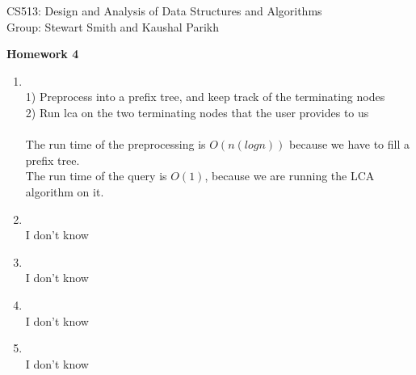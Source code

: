 \documentclass[11pt]{article}
\begin{document}

\noindent CS513: Design and Analysis of Data Structures and Algorithms \\
        Group: Stewart Smith and Kaushal Parikh\\

        \begin{center}
        \LARGE{\textbf{Homework 4}}\\
            \end{center}

            \vspace{.1in}


            \begin{enumerate}

            \item \\ 1) Preprocess into a prefix tree, and keep track of the terminating nodes\\
                     2) Run lca on the two terminating nodes that the user provides to us\\
                     \\ The run time of the preprocessing is $O(n(logn))$ because we have to fill a prefix tree.\\
                        The run time of the query is $O(1)$, because we are running the LCA algorithm on it.\\
            \item \\ I don't know\\
            \item \\ I don't know\\
            \item \\ I don't know\\
            \item \\ I don't know\\
            \end{enumerate}

                                
\end{document}

